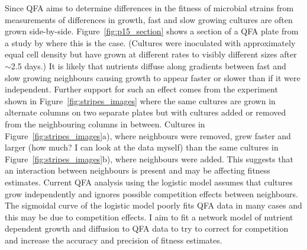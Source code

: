 Since QFA aims to determine differences in the fitness of microbial
strains from measurements of differences in growth, fast and slow
growing cultures are often grown
side-by-side. Figure~\ref{fig:p15_section} shows a section of a QFA
plate from a study by \citeauthor*{Addinall2011} where this is the
case. (Cultures were inoculated with approximately equal cell density
but have grown at different rates to visibly different sizes after
\(\sim\)2.5 days.) It is likely that nutrients diffuse along gradients
between fast and slow growing neighbours causing growth to appear
faster or slower than if it were independent. Further support for such
an effect comes from the experiment shown in
Figure~\ref{fig:stripes_images} where the same cultures are grown in
alternate columns on two separate plates but with cultures added or
removed from the neighbouring columns in between. Cultures in
Figure~\ref{fig:stripes_images}a), where neighbours were removed, grew
faster and larger (how much? I can look at the data myself) than the
same cultures in Figure~\ref{fig:stripes_images}b), where neighbours
were added. This suggests that an interaction between neighbours is
present and may be affecting fitness estimates. Current QFA analysis
using the logistic model assumes that cultures grow independently and
ignores possible competition effects between neighbours. The sigmoidal
curve of the logistic model poorly fits QFA data in many cases and
this may be due to competition effects. I aim to fit a network model of
nutrient dependent growth and diffusion to QFA data to try to correct
for competition and increase the accuracy and precision of fitness
estimates.


